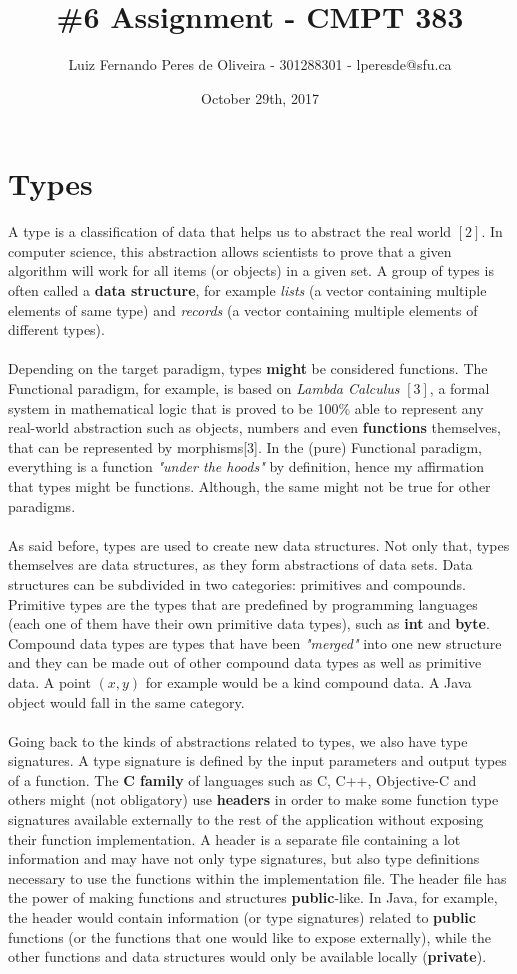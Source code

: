 \documentclass[conference]{IEEEtran}
\title{\#6 Assignment - CMPT 383}
\author{Luiz Fernando Peres de Oliveira - 301288301 - lperesde@sfu.ca}
\date{October 29th, 2017}
\begin{document}
\maketitle

\section{Types}
A type is a classification of data that helps us to abstract the real world $[2]$. In computer science, this abstraction allows scientists to prove that a given algorithm will work for all items (or objects) in a given set. A group of types is often called a \textbf{data structure}, for example \textit{lists} (a vector containing multiple elements of same type) and \textit{records} (a vector containing multiple elements of different types).
\\\\
Depending on the target paradigm, types \textbf{might} be considered functions. The Functional paradigm, for example, is based on \textit{Lambda Calculus} $[3]$, a formal system in mathematical logic that is proved to be 100\% able to represent any real-world abstraction such as objects, numbers and even \textbf{functions} themselves, that can be represented by morphisms[3]. In the (pure) Functional paradigm, everything is a function \textit{"under the hoods"} by definition, hence my affirmation that types might be functions. Although, the same might not be true for other paradigms. 
\\\\
As said before, types are used to create new data structures. Not only that, types themselves are data structures, as they form abstractions of data sets. Data structures can be subdivided in two categories: primitives and compounds. Primitive types are the types that are predefined by programming languages (each one of them have their own primitive data types), such as \textbf{int} and \textbf{byte}. Compound data types are types that have been \textit{"merged"} into one new structure and they can be made out of other compound data types as well as primitive data. A point $(x,y)$ for example would be a kind compound data. A Java object would fall in the same category.
\\\\
Going back to the kinds of abstractions related to types, we also have type signatures. A type signature is defined by the input parameters and output types of a function. The \textbf{C family} of languages such as C, C++, Objective-C and others might (not obligatory) use \textbf{headers} in order to make some function type signatures available externally to the rest of the application without exposing their function implementation. A header is a separate file containing a lot information and may have not only type signatures, but also type definitions necessary to use the functions within the implementation file. The header file has the power of making functions and structures \textbf{public}-like. In Java, for example, the header would contain information (or type signatures) related to \textbf{public} functions (or the functions that one would like to expose externally), while the other functions and data structures would only be available locally (\textbf{private}).
\end{document}
